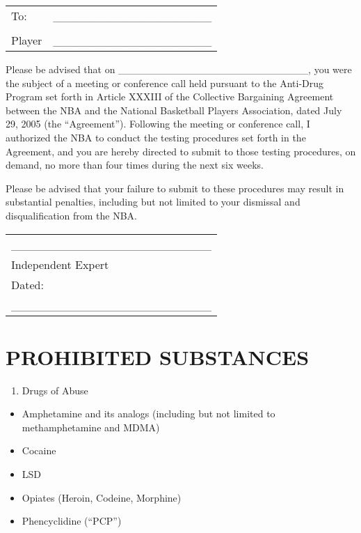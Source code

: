 \documentclass[
]{book}
\providecommand{\tightlist}{%
  \setlength{\itemsep}{0pt}\setlength{\parskip}{0pt}}
\begin{document}
\begin{longtable}[]{@{}lc@{}}
\toprule()
\endhead
To: & \_\_\_\_\_\_\_\_\_\_\_\_\_\_\_\_\_\_\_ \\
& \\
Player & \_\_\_\_\_\_\_\_\_\_\_\_\_\_\_\_\_\_\_ \\
\bottomrule()
\end{longtable}

Please be advised that on \_\_\_\_\_\_\_\_\_\_\_\_\_\_\_\_\_\_\_\_\_\_\_\_\_\_, you were the subject of a meeting or conference call held pursuant to the Anti-Drug Program set forth in Article XXXIII of the Collective Bargaining Agreement between the NBA and the National Basketball Players Association, dated July 29, 2005 (the ``Agreement''). Following the meeting or conference call, I authorized the NBA to conduct the testing procedures set forth in the Agreement, and you are hereby directed to submit to those testing procedures, on demand, no more than four times during the next six weeks.

Please be advised that your failure to submit to these procedures may result in substantial penalties, including but not limited to your dismissal and disqualification from the NBA.

\begin{longtable}[]{@{}l@{}}
\toprule()
\endhead
\_\_\_\_\_\_\_\_\_\_\_\_\_\_\_\_\_\_\_\_\_\_\_\_ \\
Independent Expert \\
Dated: \\
\_\_\_\_\_\_\_\_\_\_\_\_\_\_\_\_\_\_\_\_\_\_\_\_ \\
\bottomrule()
\end{longtable}

\hypertarget{prohibited-substances}{%
\section{PROHIBITED SUBSTANCES}\label{prohibited-substances}}

\begin{enumerate}
\def\labelenumi{(\alph{enumi})}
\tightlist
\item
  Drugs of Abuse
\end{enumerate}

\begin{itemize}
\tightlist
\item
  Amphetamine and its analogs (including but not limited to methamphetamine and MDMA)
\item
  Cocaine
\item
  LSD
\item
  Opiates (Heroin, Codeine, Morphine)
\item
  Phencyclidine (``PCP'')
\end{itemize}
\end{document}
